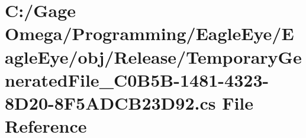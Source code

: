 \hypertarget{_release_2_temporary_generated_file__036_c0_b5_b-1481-4323-8_d20-8_f5_a_d_c_b23_d92_8cs}{}\section{C\+:/\+Gage Omega/\+Programming/\+Eagle\+Eye/\+Eagle\+Eye/obj/\+Release/\+Temporary\+Generated\+File\+\_\+C0\+B5\+B-\/1481-\/4323-\/8\+D20-\/8\+F5\+A\+D\+C\+B23\+D92.cs File Reference}
\label{_release_2_temporary_generated_file__036_c0_b5_b-1481-4323-8_d20-8_f5_a_d_c_b23_d92_8cs}
